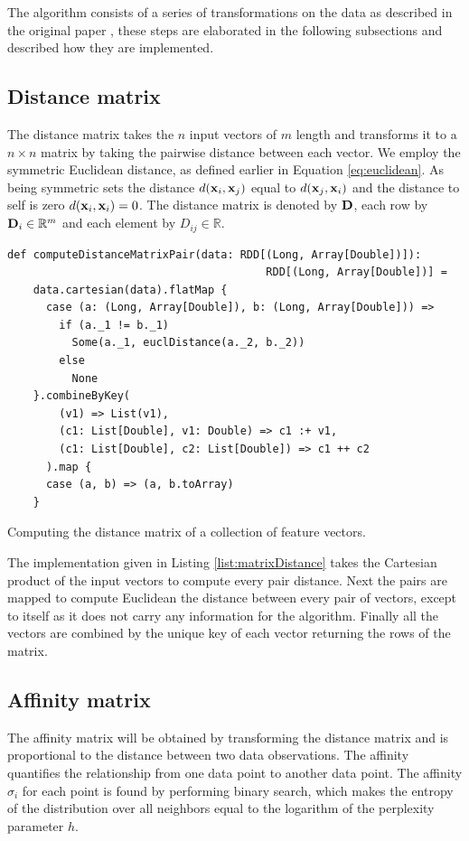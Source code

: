 The algorithm consists of a series of transformations on the data as described in the original paper \cite{MSU:CSE:00:2}, these steps are elaborated in the following subsections and described how they are implemented.

\subsection{Distance matrix \label{subsec:distancematrix}}
The distance matrix takes the $n$ input vectors of $m$ length and transforms it to a $n \times n$ matrix by taking the pairwise distance between each vector. We employ the symmetric Euclidean distance, as defined earlier in Equation \ref{eq:euclidean}. As being symmetric sets the distance $d({\bf x}_{i},{\bf x}_{j})$ equal to $d({\bf x}_{j},{\bf x}_{i})$ and the distance to self is zero $d({\bf x}_{i},{\bf x}_{i}) = 0$. The distance matrix is denoted by ${\bf D}$, each row by ${\bf D}_{i} \in \mathbb{R}^{m}$ and each element by $D_{ij} \in \mathbb{R}$.

\begin{listing}[ht!]
\begin{verbatim}
def computeDistanceMatrixPair(data: RDD[(Long, Array[Double])]): 
                                        RDD[(Long, Array[Double])] =
    data.cartesian(data).flatMap {
      case (a: (Long, Array[Double]), b: (Long, Array[Double])) =>
        if (a._1 != b._1)
          Some(a._1, euclDistance(a._2, b._2))
        else
          None
    }.combineByKey(
        (v1) => List(v1),
        (c1: List[Double], v1: Double) => c1 :+ v1,
        (c1: List[Double], c2: List[Double]) => c1 ++ c2
      ).map {
      case (a, b) => (a, b.toArray)
    }
\end{verbatim}

\caption{Computing the distance matrix of a collection of feature vectors.}
\label{list:matrixDistance}
\end{listing}

The implementation given in Listing \ref{list:matrixDistance} takes the Cartesian product of the input vectors to compute every pair distance. Next the pairs are mapped to compute Euclidean the distance between every pair of vectors, except to itself as it does not carry any information for the algorithm. Finally all the vectors are combined by the unique key of each vector returning the rows of the matrix.

\subsection{Affinity matrix \label{subsec:affinity}}
The affinity matrix will be obtained by transforming the distance matrix and is proportional to the distance between two data observations. The affinity quantifies the relationship from one data point to another data point. The affinity $\sigma_{i}$ for each point is found by performing binary search, which makes the entropy of the distribution over all neighbors equal to the logarithm of the perplexity parameter $h$.

